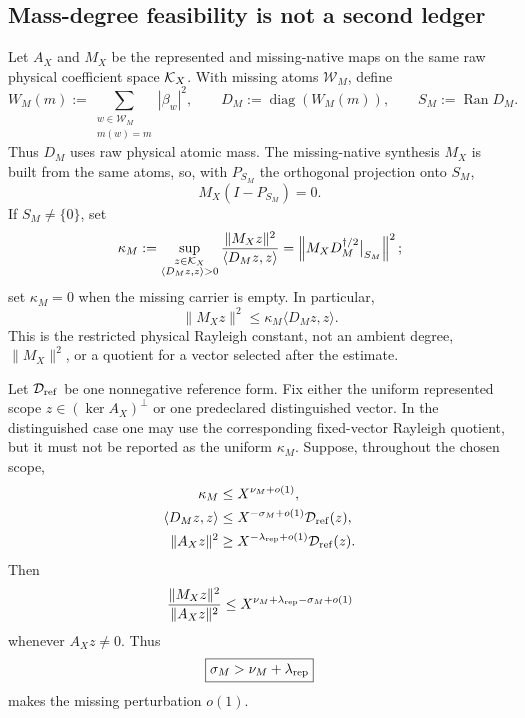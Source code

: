 \subsection{Mass-degree feasibility is not a second ledger}

Let \(A_X\) and \(M_X\) be the represented and missing-native maps on the
same raw physical coefficient space \(\mathcal K_X\).  With missing atoms
\(\mathcal W_M\), define
\begin{equation}
 W_M(m)
 :=
 \sum_{\substack{w\in\mathcal W_M\\m(w)=m}}|\beta_w|^2,
 \qquad
 D_M:=\operatorname{diag}(W_M(m)),
 \qquad
 S_M:=\operatorname{Ran}D_M.
 \label{eq:tpc72-physical-missing-diagonal}
\end{equation}
Thus \(D_M\) uses raw physical atomic mass.  The missing-native synthesis
\(M_X\) is built from the same atoms, so, with \(P_{S_M}\) the orthogonal
projection onto \(S_M\),
\begin{equation}
 M_X(I-P_{S_M})=0.
 \label{eq:tpc72-missing-kernel-compatibility}
\end{equation}
If \(S_M\ne\{0\}\), set
\begin{equation}
 \kappa_M
 :=
 \sup_{\substack{z\in\mathcal K_X\\
                 \langle D_Mz,z\rangle>0}}
 \frac{\|M_Xz\|^2}{\langle D_Mz,z\rangle}
 =
 \left\|
 M_XD_M^{\dagger/2}\big|_{S_M}
 \right\|^2;
 \label{eq:tpc72-kappa-Rayleigh}
\end{equation}
set \(\kappa_M=0\) when the missing carrier is empty.  In particular,
\begin{equation}
 \|M_Xz\|^2
 \le
 \kappa_M\langle D_Mz,z\rangle.
 \label{eq:tpc72-Rayleigh-domination}
\end{equation}
This is the restricted physical Rayleigh constant, not an ambient degree,
\(\|M_X\|^2\), or a quotient for a vector selected after the estimate.

Let \(\mathcal D_{\rm ref}\) be one nonnegative reference form.  Fix either the
uniform represented scope \(z\in(\ker A_X)^\perp\) or one predeclared
distinguished vector.  In the distinguished case one may use the
corresponding fixed-vector Rayleigh quotient, but it must not be reported
as the uniform \(\kappa_M\).  Suppose, throughout the chosen scope,
\begin{align}
 \kappa_M
 &\le X^{\nu_M+o(1)},
 \label{eq:tpc72-native-exponent}\\
 \langle D_Mz,z\rangle
 &\le
 X^{-\sigma_M+o(1)}\mathcal D_{\rm ref}(z),
 \label{eq:tpc72-missing-mass}\\
 \|A_Xz\|^2
 &\ge
 X^{-\lambda_{\rm rep}+o(1)}\mathcal D_{\rm ref}(z).
 \label{eq:tpc72-represented-comparison}
\end{align}
Then
\begin{equation}
 \frac{\|M_Xz\|^2}{\|A_Xz\|^2}
 \le
 X^{\nu_M+\lambda_{\rm rep}-\sigma_M+o(1)}
 \label{eq:tpc72-relative-missing}
\end{equation}
 whenever \(A_Xz\ne0\).  Thus
\begin{equation}
 \boxed{\sigma_M>\nu_M+\lambda_{\rm rep}}
 \label{eq:tpc72-zero-cost-reassembly}
\end{equation}
makes the missing perturbation \(o(1)\).

